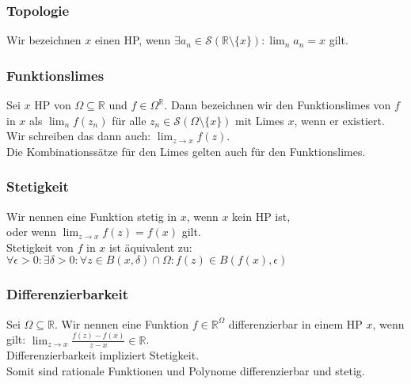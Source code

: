 \documentclass[12pt, a4paper]{article}
\begin{document}
\subsubsection*{Topologie}
Wir bezeichnen \(x\) einen HP, wenn \(\exists a_n \in \mathcal{S}(\mathbb{R} \setminus \{x\}): \lim_{n} a_n = x\) gilt.
\subsubsection*{Funktionslimes}
Sei \(x\) HP von \(\Omega \subseteq \mathbb R\) und \(f \in \Omega ^ \mathbb R\). Dann bezeichnen wir den Funktionslimes von \(f\) in \(x\) als \(\lim_{n} f(z_n)\) für alle \(z_n \in \mathcal S (\Omega \setminus \{x\})\) mit Limes \(x\), wenn er existiert. \\
Wir schreiben das dann auch: \(\lim_{z \rightarrow x} f(z)\). \\
Die Kombinationssätze für den Limes gelten auch für den Funktionslimes.
\subsubsection*{Stetigkeit}
Wir nennen eine Funktion stetig in \(x\), wenn \(x\) kein HP ist,\\
oder wenn \(\lim_{z \rightarrow x}f(z) = f(x)\) gilt. \\
Stetigkeit von \(f\) in \(x\) ist äquivalent zu:\\
\(\forall \epsilon > 0: \exists \delta > 0: \forall z \in B(x, \delta) \cap \Omega: f(z) \in B(f(x), \epsilon)\)
\subsubsection*{Differenzierbarkeit}
Sei \(\Omega \subseteq \mathbb R\). Wir nennen eine Funktion \(f \in \mathbb R^\Omega\) differenzierbar in einem HP \(x\), wenn gilt:
\(\lim_{z\rightarrow x}\frac{f(z) - f(x)}{z - x} \in \mathbb R\). \\
Differenzierbarkeit impliziert Stetigkeit. \\
Somit sind rationale Funktionen und Polynome differenzierbar und stetig.
\end{document}
